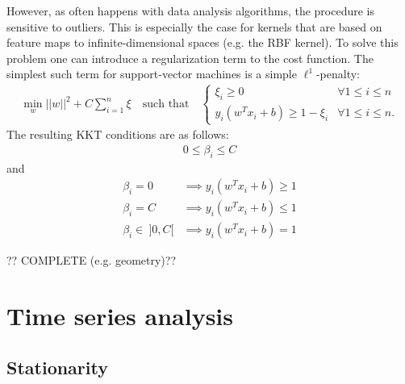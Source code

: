     However, as often happens with data analysis algorithms, the procedure is sensitive to outliers. This is especially the case for kernels that are based on feature maps to infinite-dimensional spaces (e.g. the RBF kernel). To solve this problem one can introduce a regularization term to the cost function. The simplest such term for support-vector machines is a simple $\ell^1$-penalty:
    \begin{gather}
        \min_w ||w||^2 + C\sum_{i=1}^n\xi\quad\text{such that}\quad
        \begin{cases}
            \xi_i\geq0&\forall 1\leq i\leq n\\
            y_i(w^Tx_i+b)\geq1-\xi_i&\forall 1\leq i\leq n.
        \end{cases}
    \end{gather}
    The resulting KKT conditions are as follows:
    \begin{gather}
        0\leq\beta_i\leq C
    \end{gather}
    and
    \begin{align}
        \beta_i = 0&\implies y_i(w^Tx_i+b)\geq1\\
        \beta_i = C&\implies y_i(w^Tx_i+b)\leq1\\
        \beta_i \in\ ]0, C[&\implies y_i(w^Tx_i+b)=1
    \end{align}

    ?? COMPLETE (e.g. geometry)??

\section{Time series analysis}


\subsection{Stationarity}


